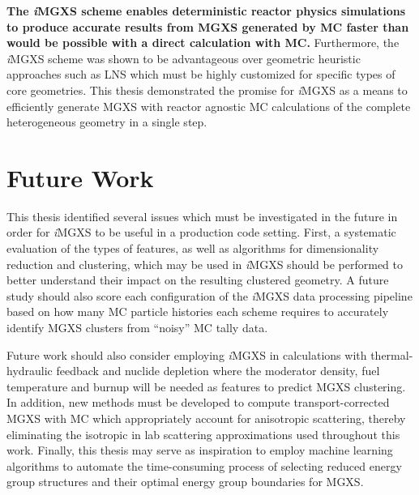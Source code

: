 \documentclass[12pt,twoside]{mitthesis-exec}
\begin{document}

\textbf{The \textit{i}MGXS scheme enables deterministic reactor physics simulations to produce accurate results from MGXS generated by MC faster than would be possible with a direct calculation with MC.} Furthermore, the \textit{i}MGXS scheme was shown to be advantageous over geometric heuristic approaches such as LNS which must be highly customized for specific types of core geometries. This thesis demonstrated the promise for \textit{i}MGXS as a means to efficiently generate MGXS with reactor agnostic MC calculations of the complete heterogeneous geometry in a single step.

\section*{Future Work}

This thesis identified several issues which must be investigated in the future in order for \textit{i}MGXS to be useful in a production code setting. First, a systematic evaluation of the types of features, as well as algorithms for dimensionality reduction and clustering, which may be used in \textit{i}MGXS should be performed to better understand their impact on the resulting clustered geometry. A future study should also score each configuration of the \textit{i}MGXS data processing pipeline based on how many MC particle histories  each scheme requires to accurately identify MGXS clusters from ``noisy'' MC tally data. 

Future work should also consider employing \textit{i}MGXS in calculations with thermal-hydraulic feedback and nuclide depletion where the moderator density, fuel temperature and burnup will be needed as features to predict MGXS clustering. In addition, new methods must be developed to compute transport-corrected MGXS with MC which appropriately account for anisotropic scattering, thereby eliminating the isotropic in lab scattering approximations used throughout this work. Finally, this thesis may serve as inspiration to employ machine learning algorithms to automate the time-consuming process of selecting reduced energy group structures and their optimal energy group boundaries for MGXS.
\end{document}
